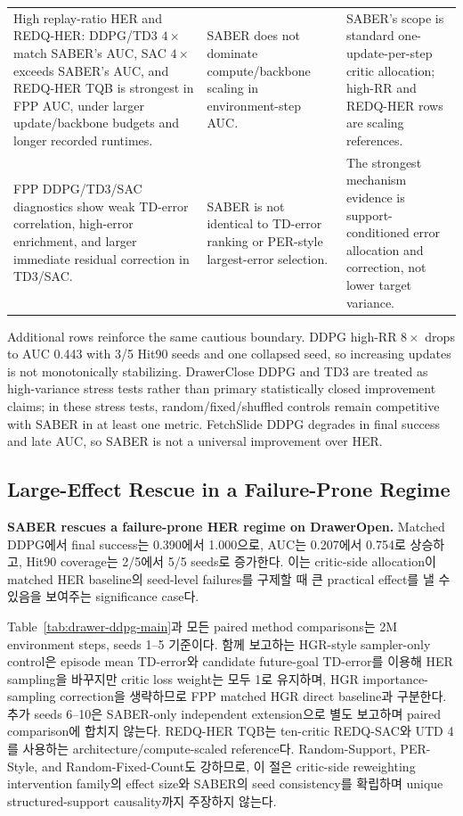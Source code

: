 \documentclass[letterpaper]{article}
\begin{document}
\begin{table}[t]
\begin{tabular}{p{}p{}p{}}
\addlinespace
High replay-ratio HER and REDQ-HER: DDPG/TD3 \(4\times\) match SABER's AUC, SAC \(4\times\) exceeds SABER's AUC, and REDQ-HER TQB is strongest in FPP AUC, under larger update/backbone budgets and longer recorded runtimes. &
SABER does not dominate compute/backbone scaling in environment-step AUC. &
SABER's scope is standard one-update-per-step critic allocation; high-RR and REDQ-HER rows are scaling references. \\
\addlinespace
FPP DDPG/TD3/SAC diagnostics show weak TD-error correlation, high-error enrichment, and larger immediate residual correction in TD3/SAC. &
SABER is not identical to TD-error ranking or PER-style largest-error selection. &
The strongest mechanism evidence is support-conditioned error allocation and correction, not lower target variance. \\
\bottomrule
\end{tabular}
\end{table}

Additional rows reinforce the same cautious boundary. DDPG high-RR \(8\times\) drops to AUC 0.443 with 3/5 Hit90 seeds and one collapsed seed, so increasing updates is not monotonically stabilizing. DrawerClose DDPG and TD3 are treated as high-variance stress tests rather than primary statistically closed improvement claims; in these stress tests, random/fixed/shuffled controls remain competitive with SABER in at least one metric. FetchSlide DDPG degrades in final success and late AUC, so SABER is not a universal improvement over HER.

\subsection{Large-Effect Rescue in a Failure-Prone Regime}

\textbf{SABER rescues a failure-prone HER regime on DrawerOpen.}
Matched DDPG에서 final success는 0.390에서 1.000으로, AUC는 0.207에서 0.754로 상승하고, Hit90 coverage는 2/5에서 5/5 seeds로 증가한다. 이는 critic-side allocation이 matched HER baseline의 seed-level failures를 구제할 때 큰 practical effect를 낼 수 있음을 보여주는 significance case다.

Table~\ref{tab:drawer-ddpg-main}과 모든 paired method comparisons는 2M environment steps, seeds 1--5 기준이다. 함께 보고하는 HGR-style sampler-only control은 episode mean TD-error와 candidate future-goal TD-error를 이용해 HER sampling을 바꾸지만 critic loss weight는 모두 1로 유지하며, HGR importance-sampling correction을 생략하므로 FPP matched HGR direct baseline과 구분한다. 추가 seeds 6--10은 SABER-only independent extension으로 별도 보고하며 paired comparison에 합치지 않는다. REDQ-HER TQB는 ten-critic REDQ-SAC와 UTD 4를 사용하는 architecture/compute-scaled reference다. Random-Support, PER-Style, and Random-Fixed-Count도 강하므로, 이 절은 critic-side reweighting intervention family의 effect size와 SABER의 seed consistency를 확립하며 unique structured-support causality까지 주장하지 않는다.
\end{document}
